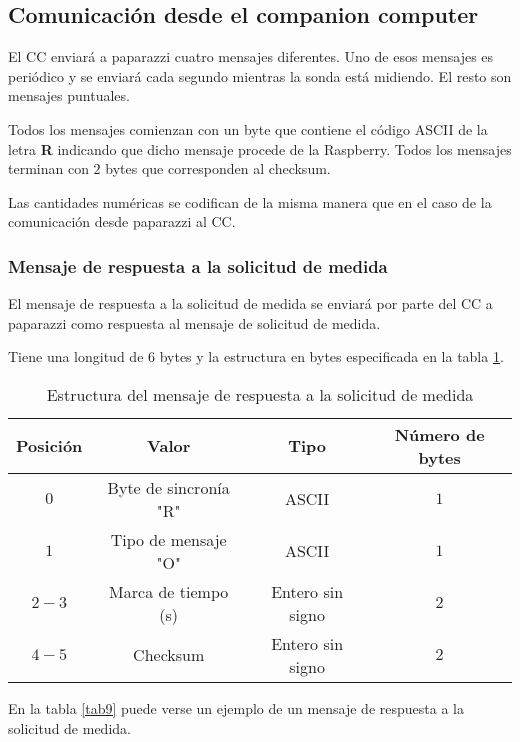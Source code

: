 \subsection{Comunicación desde el companion computer}

El CC enviará a paparazzi cuatro mensajes diferentes. Uno de esos mensajes es periódico y se enviará cada segundo mientras la sonda está midiendo. El resto son mensajes puntuales. 

Todos los mensajes comienzan con un byte que contiene el código ASCII de la letra \textbf{R} indicando que dicho mensaje procede de la Raspberry. Todos los mensajes terminan con $2$ bytes que corresponden al checksum.

Las cantidades numéricas se codifican de la misma manera que en el caso de la comunicación desde paparazzi al CC.

\subsubsection{Mensaje de respuesta a la solicitud de medida}

El mensaje de respuesta a la solicitud de medida se enviará por parte del CC a paparazzi como respuesta al mensaje de solicitud de medida.

Tiene una longitud de $6$ bytes y la estructura en bytes especificada en la tabla \ref{tab8}.

\begin{table}[h]
	\centering
	\caption{Estructura del mensaje de respuesta a la solicitud de medida}
	\begin{tabular}{|c|c|c|c|}\hline 
		\textbf{Posición}	& \textbf{Valor} & \textbf{Tipo} &\textbf{Número de bytes} \\ \hline \hline 
		$0$		& Byte de sincronía "R"				& ASCII	 			&	$1$ \\  \hline
		$1$		& Tipo de mensaje "O"				& ASCII	 			&	$1$ \\  \hline
		$2-3$	& Marca de tiempo (s)				& Entero sin signo	&   $2$ \\  \hline
		$4-5$	& Checksum 							& Entero sin signo	&   $2$ \\  \hline
	\end{tabular}
	\label{tab8}
\end{table}

En la tabla \ref{tab9} puede verse un ejemplo de un mensaje de respuesta a la solicitud de medida.

